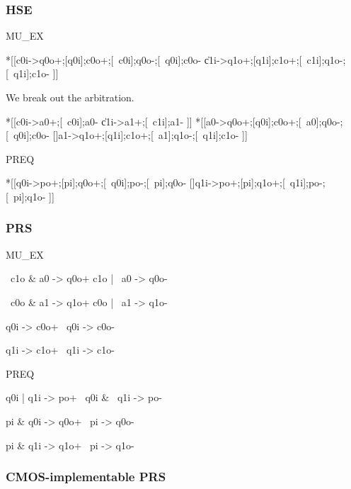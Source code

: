 \documentclass[aer.tex]{subfiles}
\begin{document}
\subsubsection*{HSE}

MU\_EX
\begin{hse}
*[[c0i->q0o+;[q0i];c0o+;[~c0i];q0o-;[~q0i];c0o-
  \|c1i->q1o+;[q1i];c1o+;[~c1i];q1o-;[~q1i];c1o-
 ]]
\end{hse}

We break out the arbitration.

\begin{hse}
*[[c0i->a0+;[~c0i];a0-
  \|c1i->a1+;[~c1i];a1-
 ]]
*[[a0->q0o+;[q0i];c0o+;[~a0];q0o-;[~q0i];c0o-
  []a1->q1o+;[q1i];c1o+;[~a1];q1o-;[~q1i];c1o-
 ]]
\end{hse}

\noindent PREQ

\begin{hse}
*[[q0i->po+;[pi];q0o+;[~q0i];po-;[~pi];q0o-
  []q1i->po+;[pi];q1o+;[~q1i];po-;[~pi];q1o-
 ]]
\end{hse}

\subsubsection*{PRS}

MU\_EX

\begin{prs2}
~c1o & a0 -> q0o+
c1o | ~a0 -> q0o-

~c0o & a1 -> q1o+
c0o | ~a1 -> q1o-
\end{prs2}

\begin{prs2}
q0i -> c0o+
~q0i -> c0o-

q1i -> c1o+
~q1i -> c1o-
\end{prs2}

\noindent PREQ

\begin{prs2}
q0i | q1i -> po+
~q0i & ~q1i -> po-
\end{prs2}

\begin{prs2}
pi & q0i -> q0o+
~pi -> q0o-

pi & q1i -> q1o+
~pi -> q1o-
\end{prs2}

\subsubsection*{CMOS-implementable PRS}
\end{document}
